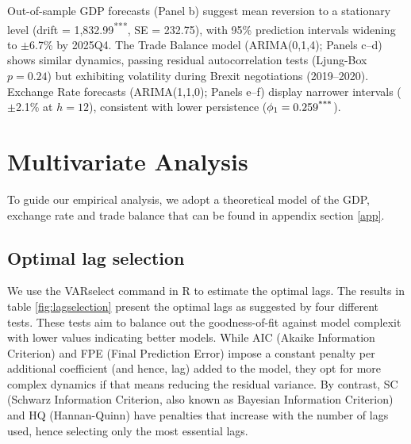 \documentclass[
]{article}
\begin{document}
	Out-of-sample GDP forecasts (Panel b) suggest mean reversion to a stationary 
	level (drift = 1,832.99\textsuperscript{***}, SE = 232.75), with 95\% prediction 
	intervals widening to $\pm$6.7\% by 2025Q4. The Trade Balance model
	(ARIMA(0,1,4); Panels c--d) shows similar dynamics, passing residual 
	autocorrelation tests (Ljung-Box $p = 0.24$) but exhibiting volatility
	during Brexit negotiations (2019--2020). Exchange Rate forecasts (ARIMA(1,1,0); 
	Panels e--f) display narrower intervals ($\pm$2.1\% at $h=12$), consistent with 
	lower persistence ($\phi_1 = 0.259\textsuperscript{***}$). 
	
	\section{Multivariate Analysis}
	
To guide our empirical analysis, we adopt a theoretical model of the GDP, exchange rate and trade balance that can be found in appendix section \ref{app}.
	
	\subsection{Optimal lag selection}
	
	We use the VARselect command in R to estimate the optimal lags. The results in 
	table \ref{fig:lagselection} present the optimal lags as suggested by four different tests. These
	tests aim to balance out the goodness-of-fit against model complexit with lower 
	values indicating better models. While AIC 
	(Akaike Information Criterion) and FPE (Final Prediction Error) impose a constant
	penalty per additional coefficient (and hence, lag) added to the model, they opt
	for more complex dynamics if that means reducing the residual variance. 
	By contrast, SC (Schwarz Information Criterion, also known as Bayesian Information Criterion) 
	and HQ (Hannan-Quinn) have penalties that increase with the number of lags used, 
	hence selecting only the most essential lags. 
	
\end{document}
